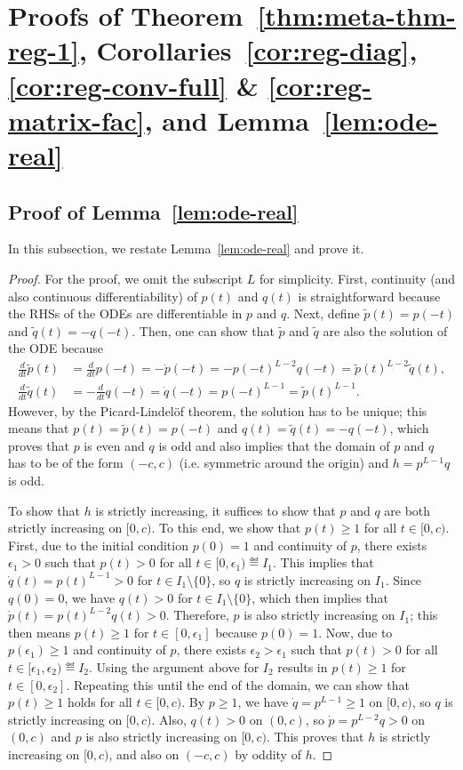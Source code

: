 \documentclass{article} %
\begin{document}
\section{Proofs of Theorem~\ref{thm:meta-thm-reg-1}, Corollaries~\ref{cor:reg-diag}, \ref{cor:reg-conv-full} \& \ref{cor:reg-matrix-fac}, and Lemma~\ref{lem:ode-real}}
\label{sec:proof-meta-thm-reg-1}
\subsection{Proof of Lemma~\ref{lem:ode-real}}
In this subsection, we restate Lemma~\ref{lem:ode-real} and prove it.
\lemodereal*

\begin{proof}
For the proof, we omit the subscript $L$ for simplicity.
First, continuity (and also continuous differentiability) of $p(t)$ and $q(t)$ is straightforward because the RHSs of the ODEs are differentiable in $p$ and $q$. Next, define $\tilde p(t) = p(-t)$ and $\tilde q(t) = -q(-t)$. Then, one can show that $\tilde p$ and $\tilde q$ are also the solution of the ODE because
\begin{align*}
    \frac{d}{dt} \tilde p(t) &= \frac{d}{dt} p(-t) = -\dot p(-t) = -p(-t)^{L-2}q(-t) = \tilde p(t)^{L-2} \tilde q(t),\\
    \frac{d}{dt} \tilde q(t) &= - \frac{d}{dt} q(-t) = \dot q(-t) = p(-t)^{L-1} = \tilde p(t)^{L-1}.
\end{align*}
However, by the Picard-Lindel\"{o}f theorem, the solution has to be unique; this means that $p(t) = \tilde p(t) = p(-t)$ and $q(t) = \tilde q(t) = -q(-t)$, which proves that $p$ is even and $q$ is odd and also implies that the domain of $p$ and $q$ has to be of the form $(-c,c)$ (i.e. symmetric around the origin) and $h = p^{L-1}q$ is odd.

To show that $h$ is strictly increasing, it suffices to show that $p$ and $q$ are both strictly increasing on $[0,c)$. To this end, we show that $p(t) \geq 1$ for all $t \in [0,c)$.
First, due to the initial condition $p(0) = 1$ and continuity of $p$, there exists $\epsilon_1 > 0$ such that $p(t) > 0$ for all $t \in [0, \epsilon_1) \eqdef I_1$. 
This implies that $\dot q(t) = p(t)^{L-1} > 0$ for $t \in I_1 \setminus \{0 \}$, so $q$ is strictly increasing on $I_1$. Since $q(0)=0$, we have $q(t) > 0$ for $t \in I_1 \setminus \{0 \}$, which then implies that $\dot p(t) = p(t)^{L-2} q(t) > 0$. Therefore, $p$ is also strictly increasing on $I_1$; this then means $p(t) \geq 1$ for $t \in [0,\epsilon_1]$ because $p(0) = 1$. Now, due to $p(\epsilon_1) \geq 1$ and continuity of $p$, there exists $\epsilon_2 > \epsilon_1$ such that $p(t) > 0$ for all $t \in [\epsilon_1, \epsilon_2) \eqdef I_2$. Using the argument above for $I_2$ results in $p(t) \geq 1$ for $t \in [0, \epsilon_2]$. Repeating this until the end of the domain, we can show that $p(t) \geq 1$ holds for all $t \in [0, c)$.
By $p \geq 1$, we have $\dot q = p^{L-1} \geq 1$ on $[0,c)$, so $q$ is strictly increasing on $[0,c)$. Also, $q(t) > 0$ on $(0,c)$, so $\dot p = p^{L-2} q > 0$ on $(0,c)$ and $p$ is also strictly increasing on $[0,c)$. This proves that $h$ is strictly increasing on $[0,c)$, and also on $(-c,c)$ by oddity of $h$. 


\end{proof}
\end{document}
